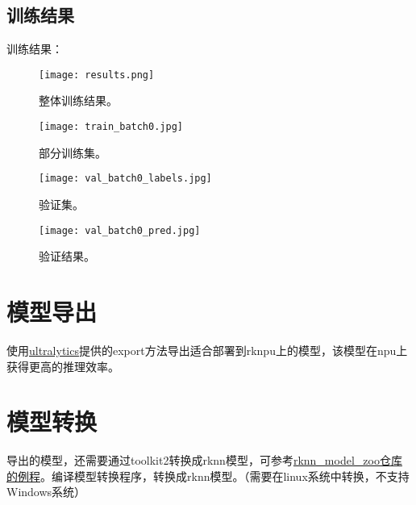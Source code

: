 \subsection{训练结果}
训练结果：
\begin{figure}[H]  %
    \centering  %
    \texttt{[image: results.png]}  %
    \caption{整体训练结果。}  %
\end{figure}
\begin{figure}[H]  %
    \centering  %
    \texttt{[image: train\_batch0.jpg]}  %
    \caption{部分训练集。}  %
\end{figure}
\begin{figure}[H]  %
    \centering  %
    \texttt{[image: val\_batch0\_labels.jpg]}  %
    \caption{验证集。}  %
\end{figure}
\begin{figure}[H]  %
    \centering  %
    \texttt{[image: val\_batch0\_pred.jpg]}  %
    \caption{验证结果。}  %
\end{figure}
\section{模型导出}
使用\href{https://github.com/airockchip/ultralytics_yolov8}{ultralytics}提供的export方法导出适合部署到rknpu上的模型，该模型在npu上获得更高的推理效率。

\section{模型转换}
导出的模型，还需要通过toolkit2转换成rknn模型，可参考\href{https://github.com/airockchip/rknn_model_zoo/tree/main/examples/yolov8}{rknn\_model\_zoo仓库的例程}。编译模型转换程序，转换成rknn模型。（需要在linux系统中转换，不支持Windows系统）

